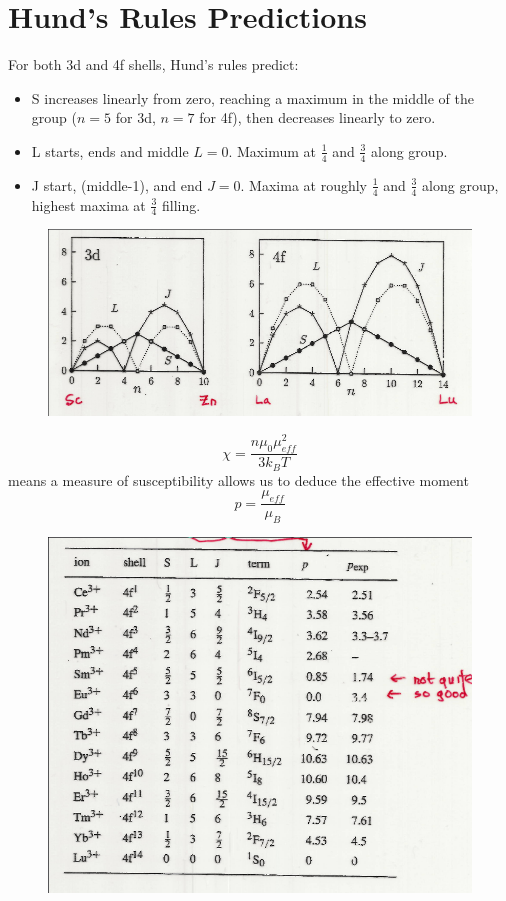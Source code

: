 \documentclass[a4paper, 11pt, normalem]{report}
\begin{document}
\section{Hund's Rules Predictions}
For both 3d and 4f shells, Hund's rules predict:
\begin{itemize}
    \item S increases linearly from zero, reaching a maximum in the middle of the group ($n=5$ for 3d, $n=7$ for 4f), then decreases linearly to zero. 
    \item L starts, ends and middle $L=0$. 
        Maximum at $\frac14$ and $\frac34$ along group. 
    \item J start, (middle-1), and end $J=0$.
        Maxima at roughly $\frac14$ and $\frac34$ along group, highest maxima at $\frac34$ filling.
\end{itemize}
\begin{figure}[H]
    \centering
    \includegraphics[scale=0.5]{hund.png}
\end{figure}
\begin{equation}
    \chi = \frac{n\mu_0\mu_{eff}^2}{3k_BT}
\end{equation}
means a measure of susceptibility allows us to deduce the effective moment
\begin{equation}
    p = \frac{\mu_{eff}}{\mu_B}
\end{equation}
\begin{figure}[H]
    \centering
    \includegraphics[scale=0.4]{mueff.png}
\end{figure}
\end{document}
